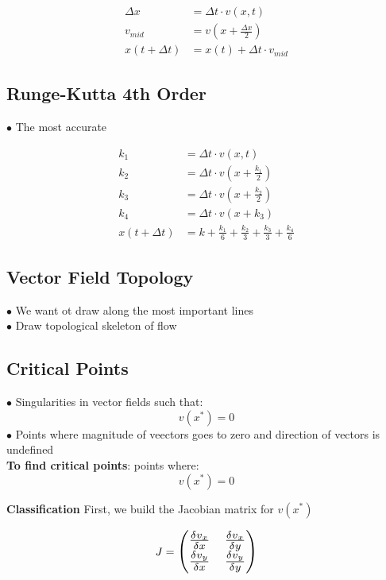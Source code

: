 \begin{align*}
    \Delta x        & = \Delta t \cdot v(x, t)                            \\
    v_{mid}         & = v(x + \frac{\Delta x}{2}) \\
    x(t + \Delta t) & = x(t) + \Delta t \cdot v_{mid}
\end{align*}

\subsection{Runge-Kutta 4th Order}
$\bullet$ The most accurate

\begin{align*}
    k_1             & = \Delta t \cdot v(x, t)                                            \\
    k_2             & = \Delta t \cdot v(x + \frac{k_1}{2})       \\
    k_3             & = \Delta t \cdot v(x + \frac{k_2}{2})       \\
    k_4             & = \Delta t \cdot v(x + k_3)                 \\
    x(t + \Delta t) & = k + \frac{k_1}{6} + \frac{k_2}{3} + \frac{k_3}{3} + \frac{k_4}{6}
\end{align*}

\subsection{Vector Field Topology}
$\bullet$ We want ot draw along the most important lines \\
$\bullet$ Draw topological skeleton of flow \\

\subsection{Critical Points}
$\bullet$ Singularities in vector fields such that: \\
$$v(x^*) = 0$$
$\bullet$ Points where magnitude of veectors goes to zero and direction of vectors is undefined \\

\textbf{To find critical points}: points where:
$$v(x^*) = 0$$

\textbf{Classification}
First, we build the Jacobian matrix for $v(x^*)$

$$J = \Scale[1.3]{\begin{pmatrix}
            \frac{\delta v_x}{\delta x} & \frac{\delta v_x}{\delta y} \\
            \frac{\delta v_y}{\delta x} & \frac{\delta v_y}{\delta y} \\
        \end{pmatrix}}$$

